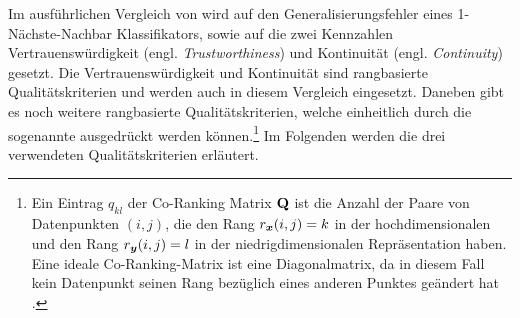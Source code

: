 Im ausführlichen Vergleich von \textcite{vanderMaaten.2009} wird auf den Generalisierungsfehler
eines 1-Nächste-Nachbar Klassifikators, sowie auf die zwei Kennzahlen Vertrauenswürdigkeit (engl.
\textit{Trustworthiness}) und Kontinuität (engl. \textit{Continuity}) \parencites{Venna.2001}{Venna.2006} gesetzt. Die Vertrauenswürdigkeit und Kontinuität sind rangbasierte
Qualitätskriterien und werden auch in diesem Vergleich eingesetzt. Daneben gibt es noch weitere
rangbasierte Qualitätskriterien, welche einheitlich durch die sogenannte
 \parencite[1432]{Lee.2009} ausgedrückt werden können.\footnote{ Ein Eintrag $q_{kl}$ der Co-Ranking
	Matrix $\mathbf{Q}$ ist die Anzahl der Paare von Datenpunkten $(i, j)$, die den Rang $r_{\bm{x}}(i,
		j) = k$ in der hochdimensionalen und den Rang $r_{\bm{y}}(i, j) = l$ in der niedrigdimensionalen
	Repräsentation haben. Eine ideale Co-Ranking-Matrix ist eine Diagonalmatrix, da in diesem Fall kein
	Datenpunkt seinen Rang bezüglich eines anderen Punktes geändert hat \parencite[1432]{Lee.2009}.} Im Folgenden werden die drei verwendeten Qualitätskriterien erläutert.


